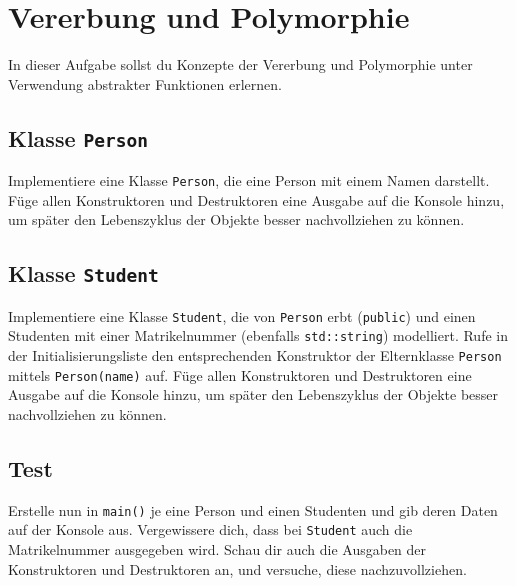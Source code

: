 \section{Vererbung und Polymorphie}\label{sec:inheritance}
In dieser Aufgabe sollst du Konzepte der Vererbung und Polymorphie unter Verwendung abstrakter Funktionen erlernen.

\subsection{Klasse \lstinline{Person}}
Implementiere eine Klasse \lstinline{Person}, die eine Person mit einem Namen darstellt.
Füge allen Konstruktoren und Destruktoren eine Ausgabe auf die Konsole hinzu, um später den Lebenszyklus der Objekte besser nachvollziehen zu können.




\subsection{Klasse \lstinline{Student}}
Implementiere eine Klasse \lstinline{Student}, die von \lstinline{Person} erbt (\lstinline{public}) und einen Studenten mit einer Matrikelnummer (ebenfalls \lstinline{std::string}) modelliert.
Rufe in der Initialisierungsliste den entsprechenden Konstruktor der Elternklasse \lstinline{Person} mittels \lstinline{Person(name)} auf.
Füge allen Konstruktoren und Destruktoren eine Ausgabe auf die Konsole hinzu, um später den Lebenszyklus der Objekte besser nachvollziehen zu können.




\subsection{Test}
Erstelle nun in \lstinline{main()} je eine Person und einen Studenten und gib deren Daten auf der Konsole aus.
Vergewissere dich, dass bei \lstinline{Student} auch die Matrikelnummer ausgegeben wird.
Schau dir auch die Ausgaben der Konstruktoren und Destruktoren an, und versuche, diese nachzuvollziehen.

